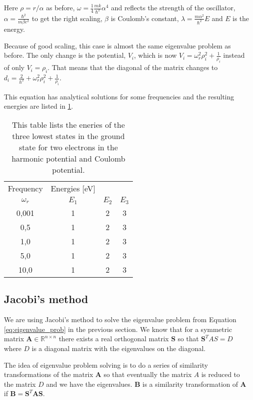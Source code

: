 Here $\rho = r/\alpha$ as before, $\omega = \frac{1}{4}\frac{mk}{\hbar^2}\alpha^4$ and reflects the strength of the oscillator, $\alpha = \frac{\hbar^2}{m \beta e^2}$ to get the right scaling, $\beta$ is Coulomb's constant, $\lambda = \frac{m\alpha^2}{\hbar^2}E$ and $E$ is the energy.

Because of good scaling, this case is almost the same eigenvalue problem as before. The only change is the potential, $V_i$, which is now $V_i = \omega_r^2 \rho_i^2+ \frac{1}{\rho_i}$ instead of only $V_i = \rho_i$. That means that the diagonal of the matrix changes to $d_i = \frac{2}{h^2} + \omega_r^2\rho_i^2 + \frac{1}{\rho_i}$.

This equation has analytical solutions for some frequencies and the resulting energies are listed in \ref{tab:analytical_energies}.

\begin{table}[H]\caption{This table lists the eneries of the three lowest states in the ground state for two electrons in the harmonic potential and Coulomb potential.}\label{tab:analytical_energies}
\begin{tabular}{cccc}\hline
Frequency & Energies [eV]\\
$\omega_r$ & $E_1$ & $E_2$ & $E_3$\\
0,001 & 1 & 2 & 3\\
0,5 & 1 & 2 & 3\\
1,0 & 1 & 2 & 3\\
5,0 & 1 & 2 & 3\\
10,0 & 1 & 2 & 3\\
\end{tabular}
\end{table}

\subsection{Jacobi's method}

We are using Jacobi's method to solve the eigenvalue problem from Equation \ref{eq:eigenvalue_prob} in the previous section. We know that for a symmetric matrix $\textbf{A} \in \mathbb{R}^{n\times n}$ there exists a real orthogonal matrix $\textbf{S}$ so that $ \textbf{S}^{T}AS = D$ where $D$ is a diagonal matrix with the eigenvalues on the diagonal.

The idea of eigenvalue problem solving is to do a series of similarity transformations of the matrix $\textbf{A}$ so that eventually the matrix $A$ is reduced to the matrix $D$ and we have the eigenvalues. $\textbf{B}$ is a similarity transformation of $\textbf{A}$ if $\textbf{B} = \textbf{S}^T\textbf{A}\textbf{S}$.


